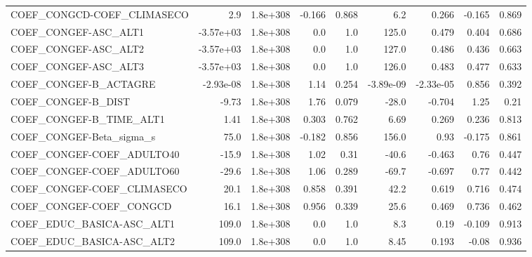\begin{tabular}{lrrrrrrrr}
COEF\_CONGCD-COEF\_CLIMASECO        &         2.9 &     1.8e+308 &  -0.166 &    0.868 &        6.2 &       0.266 &       -0.165 &         0.869 \\
COEF\_CONGEF-ASC\_ALT1              &   -3.57e+03 &     1.8e+308 &     0.0 &      1.0 &      125.0 &       0.479 &        0.404 &         0.686 \\
COEF\_CONGEF-ASC\_ALT2              &   -3.57e+03 &     1.8e+308 &     0.0 &      1.0 &      127.0 &       0.486 &        0.436 &         0.663 \\
COEF\_CONGEF-ASC\_ALT3              &   -3.57e+03 &     1.8e+308 &     0.0 &      1.0 &      126.0 &       0.483 &        0.477 &         0.633 \\
COEF\_CONGEF-B\_ACTAGRE             &   -2.93e-08 &     1.8e+308 &    1.14 &    0.254 &  -3.89e-09 &   -2.33e-05 &        0.856 &         0.392 \\
COEF\_CONGEF-B\_DIST                &       -9.73 &     1.8e+308 &    1.76 &    0.079 &      -28.0 &      -0.704 &         1.25 &          0.21 \\
COEF\_CONGEF-B\_TIME\_ALT1           &        1.41 &     1.8e+308 &   0.303 &    0.762 &       6.69 &       0.269 &        0.236 &         0.813 \\
COEF\_CONGEF-Beta\_sigma\_s          &        75.0 &     1.8e+308 &  -0.182 &    0.856 &      156.0 &        0.93 &       -0.175 &         0.861 \\
COEF\_CONGEF-COEF\_ADULTO40         &       -15.9 &     1.8e+308 &    1.02 &     0.31 &      -40.6 &      -0.463 &         0.76 &         0.447 \\
COEF\_CONGEF-COEF\_ADULTO60         &       -29.6 &     1.8e+308 &    1.06 &    0.289 &      -69.7 &      -0.697 &         0.77 &         0.442 \\
COEF\_CONGEF-COEF\_CLIMASECO        &        20.1 &     1.8e+308 &   0.858 &    0.391 &       42.2 &       0.619 &        0.716 &         0.474 \\
COEF\_CONGEF-COEF\_CONGCD           &        16.1 &     1.8e+308 &   0.956 &    0.339 &       25.6 &       0.469 &        0.736 &         0.462 \\
COEF\_EDUC\_BASICA-ASC\_ALT1         &       109.0 &     1.8e+308 &     0.0 &      1.0 &        8.3 &        0.19 &       -0.109 &         0.913 \\
COEF\_EDUC\_BASICA-ASC\_ALT2         &       109.0 &     1.8e+308 &     0.0 &      1.0 &       8.45 &       0.193 &        -0.08 &         0.936 \\

\end{tabular}
